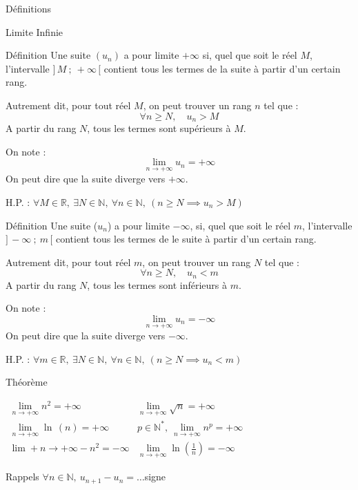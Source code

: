 \documentclass{coursbook}
\begin{document}
    \begin{Gpartie}{Définitions} 
        \begin{Spartie}{Limite Infinie}
            \begin{SSpartie}{Définition} 
                Une suite $(u_n)$ a pour limite $+\infty$ si, quel que soit le réel $M$, l'intervalle $\big]\,M~;~+\infty\,\big[$ contient tous les termes de la suite à partir d'un certain rang.

                Autrement dit, pour tout réel $M$, on peut trouver un rang $n$ tel que : \[\forall n\geq N,\quad u_n>M\]
                A partir du rang $N$, tous les termes sont supérieurs à $M$.

                On note : \[\boxed{\lim\limits_{n\to +\infty} u_n=+\infty}\] On peut dire que la suite diverge vers $+\infty$.

                H.P. : $\forall M\in\mathbb{R},~\exists N\in\mathbb{N},~\forall n\in\mathbb{N},~(n\geq N\implies u_n>M)$
            \end{SSpartie}
            \begin{SSpartie}{Définition} 
                Une suite ($u_n$) a pour limite $-\infty$, si, quel que soit le réel $m$, l'intervalle $\big]\,-\infty~;~m\,\big[$ contient tous les termes de le suite à partir d'un certain rang.

                Autrement dit, pour tout réel $m$, on peut trouver un rang $N$ tel que : \[\forall n\geq N,\quad u_n<m\]
                A partir du rang $N$, tous les termes sont inférieurs à $m$.

                On note : \[\boxed{\lim\limits_{n\to +\infty} u_n=-\infty}\] On peut dire que la suite diverge vers $-\infty$.

                H.P. : $\forall m\in\mathbb{R},~\exists N\in\mathbb{N},~\forall n\in\mathbb{N},~(n\geq N\implies u_n<m)$
            \end{SSpartie}
            \begin{SSpartie}{Théorème}
                \begin{center}$\begin{array}{cc}
                    \lim\limits_{n\to +\infty} n^2=+\infty & \lim\limits_{n\to +\infty} \sqrt{n}=+\infty \\
    
                    \lim\limits_{n\to +\infty} \ln\,(n)=+\infty & p\in\mathbb{N^*},\ \lim\limits_{n\to +\infty} n^p=+\infty \\
                    \lim\limits+{n\to +\infty} -n^2=-\infty & \lim\limits_{n\to +\infty} \ln\left(\frac{1}{n}\right)=-\infty
                \end{array}$\end{center}
            \end{SSpartie}
            \begin{SSpartie}{Rappels} 
                $\forall n\in\mathbb{N},\ u_{n+1}-u_n=\dotsc$\quad signe


\end{SSpartie}
\end{Spartie}
\end{Gpartie}
\end{document}
